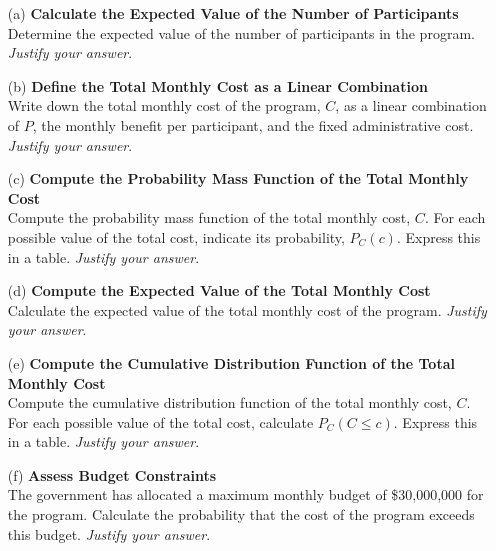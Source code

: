 \documentclass{article}
\newcommand{\blankbox}[2][3cm]{%
    \vspace{-0.5em}
    \begin{figure}[H]
        \makebox[\linewidth]{%
            \begin{tcolorbox}[
                colback=white,
                colframe=black,
                width=#2, %
                height=#1,
                boxrule=0.2mm
            ]
            \end{tcolorbox}
        }
    \end{figure}
    \vspace{-1em}
}
\begin{document}
\begin{itemize}
    \item[(a)] \textbf{Calculate the Expected Value of the Number of Participants} \\
    Determine the expected value of the number of participants in the program. \emph{Justify your answer}.
    \blankbox[5cm]{1.1\textwidth}

    \item[(b)] \textbf{Define the Total Monthly Cost as a Linear Combination} \\
    Write down the total monthly cost of the program, $C$, as a linear combination of $P$, the monthly benefit per participant, and the fixed administrative cost. \emph{Justify your answer}.
    \blankbox[5cm]{1.1\textwidth}

    \item[(c)] \textbf{Compute the Probability Mass Function of the Total Monthly Cost} \\
    Compute the probability mass function of the total monthly cost, $C$. For each possible value of the total cost, indicate its probability, $P_C(c)$. Express this in a table. \emph{Justify your answer}.
    \blankbox[5cm]{1.1\textwidth}

    \item[(d)] \textbf{Compute the Expected Value of the Total Monthly Cost} \\
    Calculate the expected value of the total monthly cost of the program. \emph{Justify your answer}.
    \blankbox[5cm]{1.1\textwidth}

    \item[(e)] \textbf{Compute the Cumulative Distribution Function of the Total Monthly Cost} \\
    Compute the cumulative distribution function of the total monthly cost, $C$. For each possible value of the total cost, calculate $P_C(C \leq c)$. Express this in a table. \emph{Justify your answer}.
    \blankbox[5cm]{1.1\textwidth}

    \item[(f)] \textbf{Assess Budget Constraints} \\
    The government has allocated a maximum monthly budget of \$30,000,000 for the program. Calculate the probability that the cost of the program exceeds this budget. \emph{Justify your answer}.
    \blankbox[5cm]{1.1\textwidth}

\end{itemize}
\end{document}
